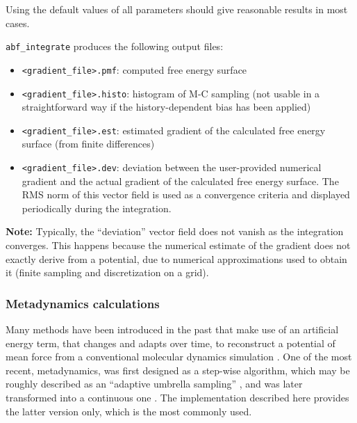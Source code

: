 Using the default values of all parameters should give reasonable results in most cases.

\bigskip
\texttt{abf\_integrate} produces the following output files:
\begin{itemize}
\setlength{\itemsep}{0pt}
\item \texttt{<gradient\_file>.pmf}: computed free energy surface
\item \texttt{<gradient\_file>.histo}: histogram of M-C sampling (not
usable in a straightforward way if the history-dependent bias has been applied)
\item \texttt{<gradient\_file>.est}: estimated gradient of the calculated free energy surface
(from finite differences)
\item \texttt{<gradient\_file>.dev}: deviation between the user-provided numerical gradient
and the actual gradient of the calculated free energy surface. The RMS norm of this vector
field is used as a convergence criteria and displayed periodically during the integration.
\end{itemize}

\textbf{Note:} Typically, the ``deviation'' vector field does not vanish as the integration
converges. This happens because the numerical estimate of the gradient does not exactly derive from a
potential, due to numerical approximations used to obtain it (finite sampling and
discretization on a grid).



\subsubsection{Metadynamics calculations}
\label{sec:colvarbias_meta}

Many methods have been introduced in the past that make use of an
artificial energy term, that changes and adapts over time, to
reconstruct a potential of mean force from a conventional molecular
dynamics simulation \cite{Huber1994, Grubmuller1995, Voter1997,
  Darve2001, Laio2002, Hummer2003}.  One of the most recent,
metadynamics, was first designed as a step-wise algorithm, which may
be roughly described as an ``adaptive umbrella sampling''
\cite{Laio2002}, and was later transformed into a continuous one
\cite{Iannuzzi2003}.  The implementation described here provides the
latter version only, which is the most commonly used.

